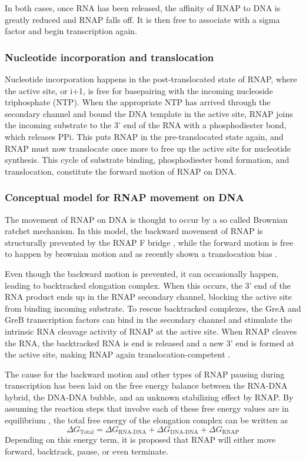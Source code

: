 In both cases, once RNA has been released, the affinity of RNAP to DNA is
greatly reduced and RNAP falls off. It is then free to associate with a
sigma factor and begin transcription again.

\subsubsection{Nucleotide incorporation and translocation}
Nucleotide incorporation happens in the post-translocated state of RNAP, where
the active site, or i+1, is free for basepairing with the incoming nucleoside
triphosphate (NTP). When the appropriate NTP has arrived through the secondary
channel and bound the DNA template in the active site, RNAP joins the incoming
substrate to the 3' end of the RNA with a phosphodiester bond, which releases
PPi. This puts RNAP in the pre-translocated state again, and RNAP must now
translocate once more to free up the active site for nucleotide synthesis. This
cycle of substrate binding, phosphodiester bond formation, and translocation,
constitute the forward motion of RNAP on DNA.

\subsubsection{Conceptual model for RNAP movement on DNA}
The movement of RNAP on DNA is thought to occur by a so called Brownian ratchet
mechanism. In this model, the backward movement of RNAP is structurally
prevented by the RNAP F bridge \cite{_ratchet_2005}, while the forward motion
is free to happen by brownian motion and as recently shown a translocation bias
\cite{hein_rna_2011}.

Even though the backward motion is prevented, it can occasionally happen,
leading to backtracked elongation complex. When this occurs, the 3' end of the
RNA product ends up in the RNAP secondary channel, blocking the active site
from binding incoming substrate. To rescue backtracked complexes, the GreA and
GreB transcription factors can bind in the secondary channel and stimulate the
intrinsic RNA cleavage activity of RNAP at the active site. When RNAP cleaves
the RNA, the backtracked RNA is end is released and a new 3' end is formed at
the active site, making RNAP again translocation-competent
\cite{toulme_grea_2000}.

The cause for the backward motion and other types of RNAP pausing during
transcription has been laid on the free energy balance between the RNA-DNA
hybrid, the DNA-DNA bubble, and an unknown stabilizing effect by
RNAP\cite{greive_thinking_2005}. By assuming the reaction steps that involve
each of these free energy values are in equilibrium
\cite{greive_thinking_2005}, the total free energy of the elongation complex
can be written as 
\begin{equation}
	\Delta G_{\text{Total}} = \Delta G_{\text{RNA-DNA}} + \Delta
	G_{\text{DNA-DNA}} + \Delta G_{\text{RNAP}}
	\label{eq:rnap_energy_balance}
\end{equation}
Depending on this energy term, it is proposed that RNAP will either move
forward, backtrack, pause, or even terminate.

